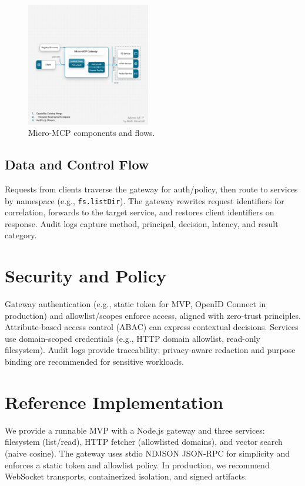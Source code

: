\documentclass[conference]{IEEEtran}
\begin{document}
\begin{figure}[t]
  \centering
  \includegraphics[width=0.48\textwidth]{figures/component-architecture-diagram.png}
  \caption{Micro-MCP components and flows.}
  \label{fig:components}
\end{figure}

\subsection{Data and Control Flow}
Requests from clients traverse the gateway for auth/policy, then route to services by namespace (e.g., \texttt{fs.listDir}). The gateway rewrites request identifiers for correlation, forwards to the target service, and restores client identifiers on response. Audit logs capture method, principal, decision, latency, and result category.

\section{Security and Policy}
Gateway authentication (e.g., static token for MVP, OpenID Connect in production\cite{oidc}) and allowlist/scopes enforce access, aligned with zero-trust principles\cite{nist-zt}. Attribute-based access control (ABAC)\cite{nist-abac} can express contextual decisions. Services use domain-scoped credentials (e.g., HTTP domain allowlist, read-only filesystem). Audit logs provide traceability; privacy-aware redaction and purpose binding are recommended for sensitive workloads.

\section{Reference Implementation}
We provide a runnable MVP with a Node.js gateway and three services: filesystem (list/read), HTTP fetcher (allowlisted domains), and vector search (naive cosine). The gateway uses stdio NDJSON JSON-RPC for simplicity and enforces a static token and allowlist policy. In production, we recommend WebSocket transports, containerized isolation, and signed artifacts.
\end{document}
